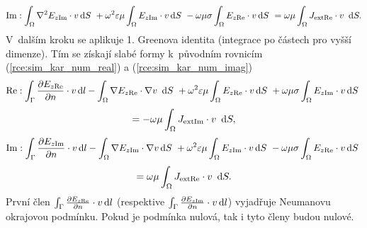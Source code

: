 \begin{equation}
	\mathrm{Im} : \int_{\Omega}\nabla^{2} E_{z\mathrm{Im}}\cdot v\,\mathrm{d} S~+ \omega^{2}\varepsilon\mu\int_{\Omega} E_{z\mathrm{Im}}\cdot v\,\mathrm{d} S~- \omega\mu\sigma\int_{\Omega} E_{z\mathrm{Re}}\cdot v\,\mathrm{d} S~= \omega\mu \int_{\Omega}J_{\mathrm{ext}\mathrm{Re}}\cdot v~\,\mathrm{d} S.
	\label{rce:sim_kar_weak_odv_imag} 
\end{equation}
V~dalším kroku se aplikuje 1. Greenova identita \cite[příloha A.2]{num} (integrace po částech pro vyšší dimenze). Tím se získají slabé formy k~původním rovnicím (\ref{rce:sim_kar_num_real}) a (\ref{rce:sim_kar_num_imag})
\begin{displaymath}
\mathrm{Re} : \int_{\Gamma}\frac{\partial E_{z\mathrm{Re}}}{\partial n}\cdot v\,\mathrm{d} l-\int_{\Omega}\nabla E_{z\mathrm{Re}}\cdot\nabla v~\,\mathrm{d} S~+ \omega^{2}\varepsilon\mu\int_{\Omega} E_{z\mathrm{Re}}\cdot v\,\mathrm{d} S~+ \omega\mu\sigma\int_{\Omega} E_{z\mathrm{Im}}\cdot v\,\mathrm{d}
S~\end{displaymath}
\begin{equation}
	 = - \omega\mu \int_{\Omega}J_{\mathrm{ext}\mathrm{Im}}\cdot v~\,\mathrm{d} S,
	\label{rce:sim_kar_weak_real} 
\end{equation}
\begin{displaymath}
\mathrm{Im} : \int_{\Gamma}\frac{\partial E_{z\mathrm{Im}}}{\partial n}\cdot v\,\mathrm{d} l-\int_{\Omega}\nabla E_{z\mathrm{Im}}\cdot\nabla v\,\mathrm{d} S~+ \omega^{2}\varepsilon\mu\int_{\Omega} E_{z\mathrm{Im}}\cdot v\,\mathrm{d} S~- \omega\mu\sigma\int_{\Omega} E_{z\mathrm{Re}}\cdot v\,\mathrm{d} S~\end{displaymath}
\begin{equation}
	= \omega\mu \int_{\Omega}J_{\mathrm{ext}\mathrm{Re}}\cdot v~\,\mathrm{d} S.
	\label{rce:sim_kar_weak_imag} 
\end{equation}
První člen $\int_{\Gamma}\frac{\partial E_{z\mathrm{Re}}}{\partial n}\cdot v\,\mathrm{d} l$ (respektive $\int_{\Gamma}\frac{\partial E_{z\mathrm{Im}}}{\partial n}\cdot v\,\mathrm{d} l$) vyjadřuje Neumanovu okrajovou podmínku. Pokud je podmínka nulová, tak i tyto členy budou nulové. 

